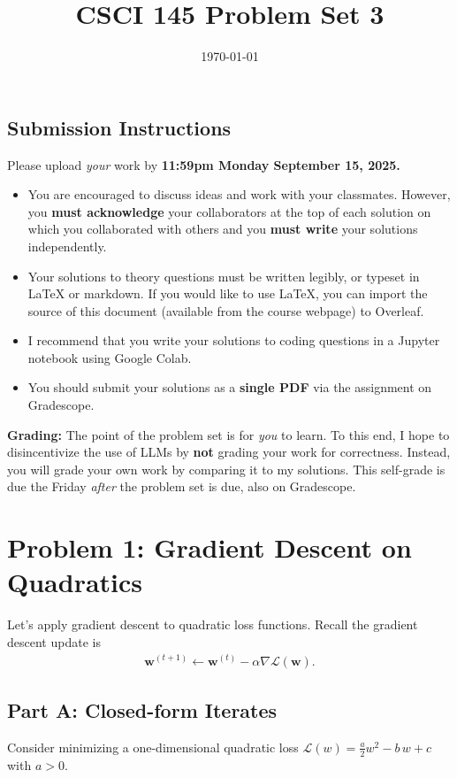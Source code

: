 \documentclass{article}
\title{CSCI 145 Problem Set 3}
\author{} %
\date{\today}
\begin{document}
\maketitle

\subsection*{Submission Instructions}

Please upload \textit{your} work by
\textbf{11:59pm Monday September 15, 2025.}
\begin{itemize}
\item You are encouraged to discuss ideas
and work with your classmates. However, you
\textbf{must acknowledge} your collaborators
at the top of each solution on which
you collaborated with others 
and you \textbf{must write} your solutions
independently.
\item Your solutions to theory questions must
be written legibly, or typeset in LaTeX or markdown.
If you would like to use LaTeX, you can import the source of this document (available from the course webpage) to Overleaf.
\item I recommend that you write your solutions to coding questions in a Jupyter notebook using Google Colab.
\item You should submit your solutions as a \textbf{single PDF} via the assignment on Gradescope.
\end{itemize}

\noindent
\textbf{Grading:} The point of the problem set is for \textit{you} to learn. To this end, I hope to disincentivize the use of LLMs by \textbf{not} grading your work for correctness. Instead, you will grade your own work by comparing it to my solutions. This self-grade is due the Friday \textit{after} the problem set is due, also on Gradescope.

\newpage
\section*{Problem 1: Gradient Descent on Quadratics}

Let's apply gradient descent to quadratic loss functions.
Recall the gradient descent update is
\begin{align}
    \mathbf{w}^{(t+1)} \gets 
    \mathbf{w}^{(t)}
    - \alpha \nabla \mathcal{L}(\mathbf{w}).
\end{align}

\subsection*{Part A: Closed-form Iterates}
Consider minimizing a one-dimensional quadratic loss
$\mathcal{L}(w) = \frac{a}{2} w^2 - b\, w + c$ with $a>0.$
\end{document}
